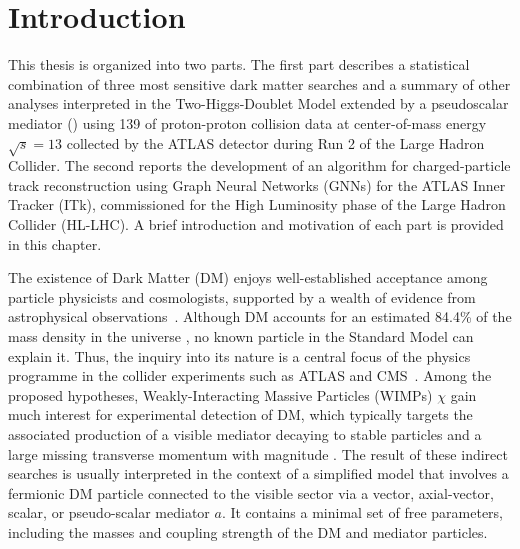  \chapter{Introduction}

This thesis is organized into two parts.
The first part describes a statistical combination of three most sensitive dark matter searches and a summary of other analyses interpreted in the Two-Higgs-Doublet
Model extended by a pseudoscalar mediator (\thdma) using 139 \ifb of 
proton-proton collision data at center-of-mass energy $\sqrt{s}=13$ \TeV collected by the ATLAS detector \cite{atlas_exp_2008} during Run 2 of the 
Large Hadron Collider. 
The second reports the development of an algorithm for charged-particle track reconstruction using Graph Neural Networks (GNNs) for the ATLAS 
Inner Tracker (ITk), commissioned for the High Luminosity phase of the Large Hadron Collider (HL-LHC).
A brief introduction and motivation of each part is provided in this chapter.

The existence of Dark Matter (DM) enjoys well-established acceptance among particle physicists and cosmologists, supported by a 
wealth of evidence from astrophysical observations~\cite{Corbelli:1999af,Rubin:1980,Begemann:1991,Hinshaw:2012aka,Akrami:2018vks,Trimble1987,Bertone2005,Feng2010}. 
Although DM accounts for an estimated 84.4\% of the mass density in the universe \cite{Zyla:2020zbs}, no known particle in the Standard Model can explain it.
Thus, the inquiry into its nature is a central focus of the physics programme in the collider experiments such as ATLAS and CMS~\cite{adan2023darkmattersearchescms}. 
Among the proposed hypotheses, Weakly-Interacting Massive Particles (WIMPs) $\chi$ \cite{Steigman:1984ac} gain much interest for experimental detection of DM, which typically targets the associated production of a visible mediator decaying to stable particles and a large missing transverse momentum with magnitude \met.
The result of these indirect searches is usually interpreted in the context of a simplified model that involves a fermionic DM particle connected to the visible sector via a vector, axial-vector, scalar, or pseudo-scalar mediator $a$. 
It contains a minimal set of free parameters, including the masses and coupling strength of the DM and mediator particles. 

